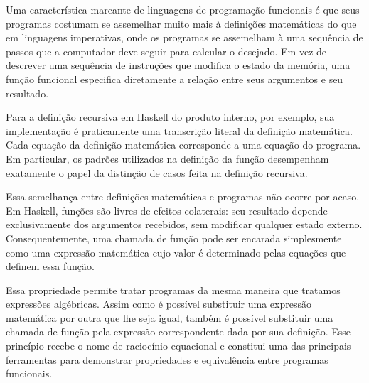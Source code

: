 
Uma característica marcante de linguagens de programação funcionais é que seus programas costumam se assemelhar muito mais à definições matemáticas do que em linguagens imperativas, onde os programas se assemelham à uma sequência de passos que a computador deve seguir para calcular o desejado. Em vez de descrever uma sequência de instruções que modifica o estado da memória, uma função funcional especifica diretamente a relação entre seus argumentos e seu resultado.

Para a definição recursiva em Haskell do produto interno, por exemplo, sua implementação é praticamente uma transcrição literal da definição matemática. Cada equação da definição matemática corresponde a uma equação do programa. Em particular, os padrões utilizados na definição da função desempenham exatamente o papel da distinção de casos feita na definição recursiva.

Essa semelhança entre definições matemáticas e programas não ocorre por acaso. Em Haskell, funções são livres de efeitos colaterais: seu resultado depende exclusivamente dos argumentos recebidos, sem modificar qualquer estado externo. Consequentemente, uma chamada de função pode ser encarada simplesmente como uma expressão matemática cujo valor é determinado pelas equações que definem essa função.

Essa propriedade permite tratar programas da mesma maneira que tratamos expressões algébricas. Assim como é possível substituir uma expressão matemática por outra que lhe seja igual, também é possível substituir uma chamada de função pela expressão correspondente dada por sua definição. Esse princípio recebe o nome de raciocínio equacional e constitui uma das principais ferramentas para demonstrar propriedades e equivalência entre programas funcionais.